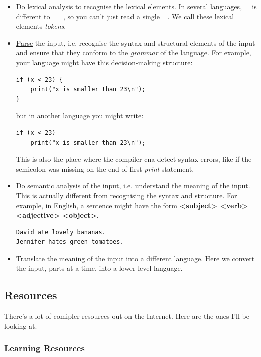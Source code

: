 \documentclass[a4paper,12pt]{article}
\begin{document}
\begin{itemize}
    \item Do \href{https://en.wikipedia.org/wiki/Lexical_analysis}{lexical analysis} to recognise the lexical elements. In several languages, {\color{red}=} is different to {\color{red}==}, so you can't just read a single {\color{red}=}. We call these lexical elements \textit{tokens}.
    \item \href{https://en.wikipedia.org/wiki/Parsing}{Parse} the input, i.e. recognise the syntax and structural elements of the input and ensure that they conform to the \textit{grammar} of the language. For example, your language might have this decision-making structure:
    \begin{lstlisting}
if (x < 23) {
    print("x is smaller than 23\n");
}
    \end{lstlisting}
    but in another language you might write:
    \begin{lstlisting}
if (x < 23)
    print("x is smaller than 23\n");
    \end{lstlisting}
    This is also the place where the compiler cna detect syntax errors, like if the semicolon was missing on the end of first \textit{print} statement.
    \item Do \href{https://en.wikipedia.org/wiki/Semantic_analysis_(compilers)}{semantic analysis} of the input, i.e. understand the meaning of the input. This is actually different from recognising the syntax and structure. For example, in English, a sentence might have the form \textbf{<subject> <verb> <adjective> <object>}.
    \begin{lstlisting}
David ate lovely bananas.
Jennifer hates green tomatoes.
    \end{lstlisting}
    \item \href{https://en.wikipedia.org/wiki/Code_generation_(compiler)}{Translate} the meaning of the input into a different language. Here we convert the input, parts at a time, into a lower-level language.
\end{itemize}

\subsection{Resources}

There's a lot of comipler resources out on the Internet. Here are the ones I'll be looking at.

\subsubsection{Learning Resources}
\end{document}
